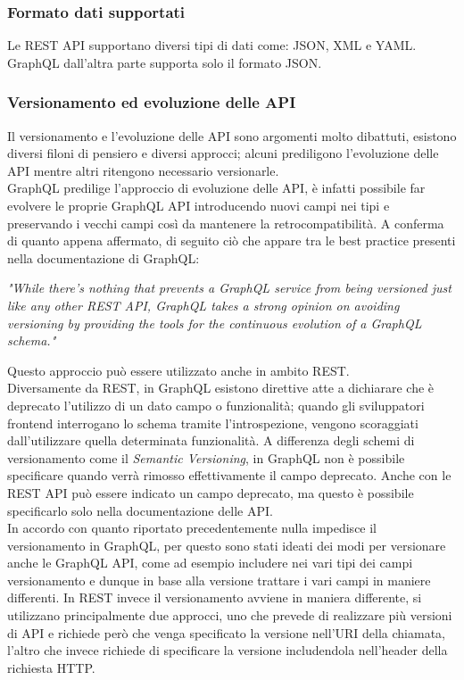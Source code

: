 \subsubsection*{Formato dati supportati}
Le REST API supportano diversi tipi di dati come: JSON, XML e YAML. GraphQL dall'altra parte supporta solo il formato JSON.
\subsubsection*{Versionamento ed evoluzione delle API}
Il versionamento e l'evoluzione delle API sono argomenti molto dibattuti, esistono diversi filoni di pensiero e diversi approcci; alcuni prediligono l'evoluzione delle API mentre altri ritengono necessario versionarle.\\
GraphQL predilige l'approccio di evoluzione delle API, è infatti possibile far evolvere le proprie GraphQL API introducendo nuovi campi nei tipi e preservando i vecchi campi così da mantenere la retrocompatibilità. A conferma di quanto appena affermato, di seguito ciò che appare tra le best practice presenti nella documentazione di GraphQL:
\begin{quoting}
  \textit{"While there’s nothing that prevents a GraphQL service from being versioned just like any other REST API, GraphQL takes a strong opinion on avoiding versioning by providing the tools for the continuous evolution of a GraphQL schema."}
\end{quoting}
Questo approccio può essere utilizzato anche in ambito REST.\\
Diversamente da REST, in GraphQL esistono direttive atte a dichiarare che è deprecato l'utilizzo di un dato campo o funzionalità; quando gli sviluppatori frontend interrogano lo schema tramite l'introspezione, vengono scoraggiati dall'utilizzare quella determinata funzionalità. A differenza degli schemi di versionamento come il \textit{Semantic Versioning}, in GraphQL non è possibile specificare quando verrà rimosso effettivamente il campo deprecato. Anche con le REST API può essere indicato un campo deprecato, ma questo è possibile specificarlo solo nella documentazione delle API.\\
In accordo con quanto riportato precedentemente nulla impedisce il versionamento in GraphQL, per questo sono stati ideati dei modi per versionare anche le GraphQL API, come ad esempio includere nei vari tipi dei campi versionamento e dunque in base alla versione trattare i vari campi in maniere differenti. In REST invece il versionamento avviene in maniera differente, si utilizzano principalmente due approcci, uno che prevede di realizzare più versioni di API e richiede però che venga specificato la versione nell'URI della chiamata, l'altro che invece richiede di specificare la versione includendola nell'header della richiesta HTTP.
